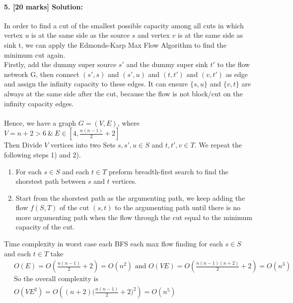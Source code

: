 \documentclass[a4paper]{scrartcl}
\begin{document}
\paragraph{5. [20 marks] Solution:}
\label{sec:Question 5}
In order to find a cut of the smallest possible capacity among all cuts in which vertex $u$ is at the same side as the source $s$ and vertex $v$ is at the same side as sink t, we can apply the Edmonds-Karp Max Flow Algorithm to find the minimum cut again.\\
Firstly, add the dummy super source $s'$ and the dummy super sink $t'$ to the flow network G, then connect $(s', s)$ and $(s', u)$ and $(t,t')$ and $(v, t')$ as edge and assign the infinity capacity to these edges. It can ensure $\{s,u\}$ and $\{v, t\}$ are always at the same side after the cut, because the flow is not block/cut on the infinity capacity edges.\\
\\
Hence, we have a graph $G=(V,E)$, where $V=n + 2 > 6\ \&\ E\in [4, \frac{n(n-1)}{2}+2]$\\
Then Divide $V$ vertices into two Sets $s, s',u \in S$ and $t, t',v \in T$. We repeat the following steps 1) and 2).
\begin{enumerate}[label=\arabic{*})]
  \item For each $s \in S$ and each $t \in T$ preform breadth-first search to find the shorstest path between $s$ and $t$ vertices.
  \item Start from the shorstest path as the argumenting path, we keep adding the flow $f(S,T)$ of the cut $(s,t)$ to the argumenting path until there is no more argumenting path when the flow through the cut equal to the minimum capacity of the cut.
\end{enumerate}
Time complexity in worst case each BFS each max flow finding for each $s \in S$ and each $t \in T$ take
\begin{align*}
  &\ O(E)=O(\frac{n(n-1)}{2}+2)=O(n^2)\text{ and }O(VE)=O(\frac{n(n-1)(n+2)}{2}+2)=O(n^3)\\ &\
  \text{So the overall complexity is}\\ &\
  O(VE^2)=O((n+2)\big(\frac{n(n-1)}{2}+2\big)^2) = O(n^5)
\end{align*}
\end{document}
